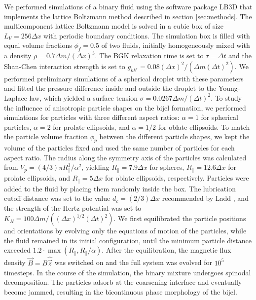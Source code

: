We performed simulations of a binary fluid using the software package
LB3D \cite{schmieschek_lb3d_2017} that implements the lattice Boltzmann method described in section
\ref{sec:methods}. The multicomponent
lattice Boltzmann model is solved in a cubic box of size
\(L_V=256\Delta x\) with periodic boundary conditions. The simulation
box is filled with equal volume fractions \(\phi_f=0.5\) of two fluids,
initially homogeneously mixed with a density
\(\rho=0.7\Delta m/(\Delta x)^3\). The BGK relaxation time is set to
\(\tau=\Delta t\) and the Shan-Chen interaction strength is set to
\(g_{kk^\star}=0.08(\Delta x)^2/(\Delta m(\Delta t)^2)\). We performed
preliminary simulations of a spherical droplet with these parameters and
fitted the pressure difference inside and outside the droplet to the
Young-Laplace law, which yielded a surface tension
\(\sigma=0.0267\Delta m/(\Delta t)^2\). To study the influence of
anisotropic particle shapes on the bijel formation, we performed
simulations for particles with three different aspect ratios:
\(\alpha=1\) for spherical particles, \(\alpha=2\) for prolate
ellipsoids, and \(\alpha=1/2\) for oblate ellipsoids. To match the
particle volume fraction \(\phi_p\) between the different particle
shapes, we kept the volume of the particles fixed and used the same
number of particles for each aspect ratio. The radius along the symmetry
axis of the particles was calculated from
\(V_p=(4/3)\pi R_\parallel^3/\alpha^2\), yielding
\(R_\parallel=7.9\Delta x\) for spheres, \(R_\parallel=12.6\Delta x\)
for prolate ellipsoids, and \(R_\parallel=5\Delta x\) for oblate
ellipsoids, respectively. Particles were added to the fluid by placing
them randomly inside the box. The lubrication cutoff distance was set to
the value \(d_c=(2/3)\Delta x\) recommended by Ladd
\cite{ladd_lattice-boltzmann_2001}, and the strength of the Hertz
potential was set to \(K_H=100\Delta m/((\Delta x)^{1/2}(\Delta t)^2)\).
We first equilibrated the particle positions and orientations by
evolving only the equations of motion of the particles, while the fluid
remained in its initial configuration, until the minimum particle
distance exceeded \(1.2\cdot\max(R_\parallel,R_\parallel/\alpha)\).
After the equilibration, the magnetic flux density
\(\vec{B}=B\hat{\vec{z}}\) was switched on and the full system was
evolved for \(10^5\) timesteps. In the course of the simulation, the binary mixture undergoes spinodal decomposition. 
The particles adsorb at the coarsening interface and eventually become jammed, resulting in the bicontinuous phase 
morphology of the bijel.

